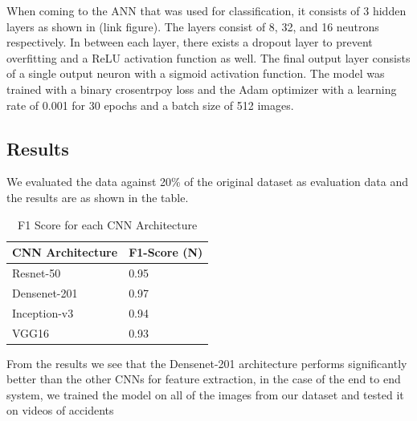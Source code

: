 \documentclass[ 12pt,a4paper,twocolumn,fleqn]{article}
\begin{document}
\begin{adjustwidth}{3.5em}{0pt}
\hspace{0.2cm}

When coming to the ANN that was used for classification, it consists of 3 hidden layers as shown in (link figure). The layers consist of 8, 32, and 16 neutrons respectively. In between each layer, there exists a dropout layer to prevent overfitting and a ReLU activation function as well. The final output layer consists of a single output neuron with a sigmoid activation function. The model was trained with a binary crosentrpoy loss and the Adam optimizer with a learning rate of 0.001 for 30 epochs and a batch size of 512 images.

\hspace{0.2cm}

\newpage
  \pagestyle{fancy}

\subsection{Results}

We evaluated the data against 20\% of the original dataset as evaluation data and the results are as shown in the table.

\begin{table}[H]
\centering
\footnotesize
\begin{tabular}{|p{4cm}| p{4cm}|}
\hline
CNN Architecture & F1-Score (N)\\
\hline\hline
Resnet-50 & 0.95 \\
Densenet-201 & 0.97 \\
Inception-v3 & 0.94 \\
VGG16 & 0.93 \\
\hline
\end{tabular}
\caption{F1 Score for each CNN Architecture}
\label{table:10}
\end{table}

\hspace{0.2cm}

From the results we see that the Densenet-201 architecture performs significantly better than the other CNNs for feature extraction, in the case of the end to end system, we trained the model on all of the images from our dataset and tested it on videos of accidents

\hspace{0.2cm}


\end{adjustwidth}
\end{document}
